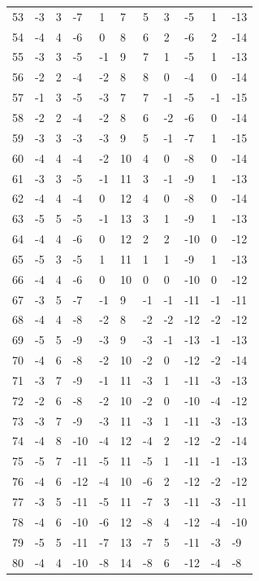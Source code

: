 \begin{table}[H]
\begin{tabular}{lllllllllll}
53 & -3 & 3 & -7 & 1 & 7 & 5 & 3 & -5 & 1 & -13 \\
54 & -4 & 4 & -6 & 0 & 8 & 6 & 2 & -6 & 2 & -14 \\
55 & -3 & 3 & -5 & -1 & 9 & 7 & 1 & -5 & 1 & -13 \\
56 & -2 & 2 & -4 & -2 & 8 & 8 & 0 & -4 & 0 & -14 \\
57 & -1 & 3 & -5 & -3 & 7 & 7 & -1 & -5 & -1 & -15 \\
58 & -2 & 2 & -4 & -2 & 8 & 6 & -2 & -6 & 0 & -14 \\
59 & -3 & 3 & -3 & -3 & 9 & 5 & -1 & -7 & 1 & -15 \\
60 & -4 & 4 & -4 & -2 & 10 & 4 & 0 & -8 & 0 & -14 \\
61 & -3 & 3 & -5 & -1 & 11 & 3 & -1 & -9 & 1 & -13 \\
62 & -4 & 4 & -4 & 0 & 12 & 4 & 0 & -8 & 0 & -14 \\
63 & -5 & 5 & -5 & -1 & 13 & 3 & 1 & -9 & 1 & -13 \\
64 & -4 & 4 & -6 & 0 & 12 & 2 & 2 & -10 & 0 & -12 \\
65 & -5 & 3 & -5 & 1 & 11 & 1 & 1 & -9 & 1 & -13 \\
66 & -4 & 4 & -6 & 0 & 10 & 0 & 0 & -10 & 0 & -12 \\
67 & -3 & 5 & -7 & -1 & 9 & -1 & -1 & -11 & -1 & -11 \\
68 & -4 & 4 & -8 & -2 & 8 & -2 & -2 & -12 & -2 & -12 \\
69 & -5 & 5 & -9 & -3 & 9 & -3 & -1 & -13 & -1 & -13 \\
70 & -4 & 6 & -8 & -2 & 10 & -2 & 0 & -12 & -2 & -14 \\
71 & -3 & 7 & -9 & -1 & 11 & -3 & 1 & -11 & -3 & -13 \\
72 & -2 & 6 & -8 & -2 & 10 & -2 & 0 & -10 & -4 & -12 \\
73 & -3 & 7 & -9 & -3 & 11 & -3 & 1 & -11 & -3 & -13 \\
74 & -4 & 8 & -10 & -4 & 12 & -4 & 2 & -12 & -2 & -14 \\
75 & -5 & 7 & -11 & -5 & 11 & -5 & 1 & -11 & -1 & -13 \\
76 & -4 & 6 & -12 & -4 & 10 & -6 & 2 & -12 & -2 & -12 \\
77 & -3 & 5 & -11 & -5 & 11 & -7 & 3 & -11 & -3 & -11 \\
78 & -4 & 6 & -10 & -6 & 12 & -8 & 4 & -12 & -4 & -10 \\
79 & -5 & 5 & -11 & -7 & 13 & -7 & 5 & -11 & -3 & -9 \\
80 & -4 & 4 & -10 & -8 & 14 & -8 & 6 & -12 & -4 & -8 \\

\end{tabular}
\end{table}
